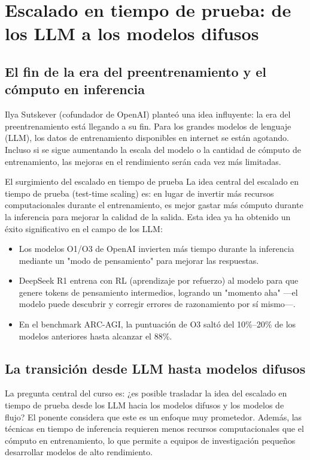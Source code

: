 \documentclass[a4paper]{article}
\begin{document}
\section{Escalado en tiempo de prueba: de los LLM a los modelos difusos}

\subsection{El fin de la era del preentrenamiento y el cómputo en inferencia}

Ilya Sutskever (cofundador de OpenAI) planteó una idea influyente: la era del preentrenamiento está llegando a su fin. Para los grandes modelos de lenguaje (LLM), los datos de entrenamiento disponibles en internet se están agotando. Incluso si se sigue aumentando la escala del modelo o la cantidad de cómputo de entrenamiento, las mejoras en el rendimiento serán cada vez más limitadas.

\begin{knowledgebox}{El surgimiento del escalado en tiempo de prueba}
La idea central del escalado en tiempo de prueba (test-time scaling) es: en lugar de invertir más recursos computacionales durante el entrenamiento, es mejor gastar más cómputo durante la inferencia para mejorar la calidad de la salida. Esta idea ya ha obtenido un éxito significativo en el campo de los LLM:
\begin{itemize}
    \item Los modelos O1/O3 de OpenAI invierten más tiempo durante la inferencia mediante un "modo de pensamiento" para mejorar las respuestas.
    \item DeepSeek R1 entrena con RL (aprendizaje por refuerzo) al modelo para que genere tokens de pensamiento intermedios, logrando un "momento aha" —el modelo puede descubrir y corregir errores de razonamiento por sí mismo—.
    \item En el benchmark ARC-AGI, la puntuación de O3 saltó del 10\%--20\% de los modelos anteriores hasta alcanzar el 88\%.
\end{itemize}
\end{knowledgebox}

\subsection{La transición desde LLM hasta modelos difusos}

La pregunta central del curso es: ¿es posible trasladar la idea del escalado en tiempo de prueba desde los LLM hacia los modelos difusos y los modelos de flujo? El ponente considera que este es un enfoque muy prometedor. Además, las técnicas en tiempo de inferencia requieren menos recursos computacionales que el cómputo en entrenamiento, lo que permite a equipos de investigación pequeños desarrollar modelos de alto rendimiento.
\end{document}
